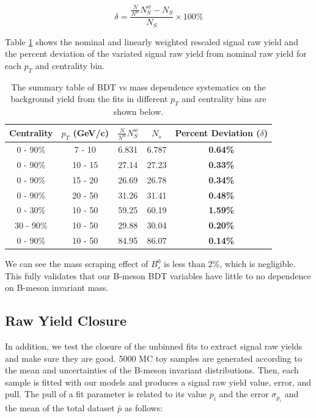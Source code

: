 \begin{equation}
\delta = \frac{\frac{N}{N^{w}} N^{w}_S - N_S}{N_S} \times 100\%
\end{equation}

Table \ref{MassScrapCheck} shows the nominal and linearly weighted rescaled signal raw yield and the percent deviation of the variated signal raw yield from nominal raw yield for each $p_T$ and centrality bin.

\begin{table}[h]
\begin{center}
\caption{The summary table of BDT vs mass dependence systematics on the background yield from the fits in different $p_T$ and centrality bins are shown below.}
\vspace{1em}
\label{MassScrapCheck}
  \begin{tabular}{ |c | c | c| c| c|}
        \hline
     Centrality &  $p_T$ (GeV/c) & $\frac{N}{N^{w}} N^{w}_S$ & $N_{s}$ & Percent Deviation ($\delta$)  \\
    \hline
    \hline
0 - 90\% & 7 - 10 & 6.831  & 6.787 & \textbf{0.64\%} \\ 
0 - 90\% & 10 - 15 &  27.14 & 27.23 & \textbf{0.33\%}  \\ 
0 - 90\% & 15 - 20 & 26.69   & 26.78  &   \textbf{0.34\%}\\ 
0 - 90\% & 20 - 50 &  31.26 &  31.41 &  \textbf{0.48\%}  \\ 
0 - 30\% & 10 - 50 & 59.25  &  60.19  &  \textbf{1.59\%}  \\ 
30 - 90\% & 10 - 50 & 29.88 & 30.04 &  \textbf{0.20\%}    \\ 
0 - 90\% & 10 - 50 & 84.95 & 86.07 &  \textbf{0.14\%}  \\ 
    \hline
\end{tabular}
\end{center}
\end{table}
 

We can see the mass scraping effect of $B^0_s$ is less than 2\%, which is negligible. This fully validates that our B-meson BDT variables have little to no dependence on B-meson invariant mass.

\subsection{Raw Yield Closure}

In addition, we test the closure of the unbinned fits to extract signal raw yields and make sure they are good. 5000 MC toy samples are generated according to the mean and uncertainties of the B-meson invariant distributions. Then, each sample is fitted with our models and produces a signal raw yield value, error, and pull. The pull of a fit parameter is related to its value $p_i$ and the error $\sigma_{p_i}$ and the mean of the total dataset $\bar p$ as follows:

